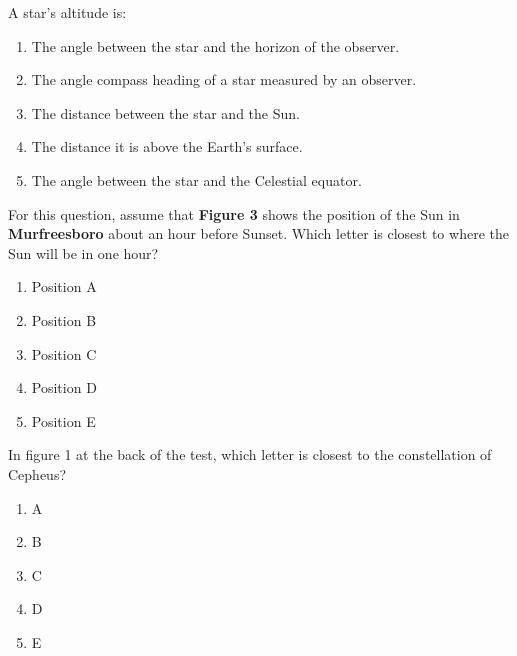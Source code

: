 \documentclass[11pt]{article}
\begin{document}
\begin{enumerate}
\begin{minipage}{\textwidth}
\begin{minipage}{\textwidth}
\item A star's altitude is:
\begin{enumerate} 
\setlength{\itemsep}{1pt} 
\setlength{\parskip}{0pt} 
\setlength{\parsep}{0pt}
\setlength{\multicolsep}{1pt} 
\item The angle between the star and the horizon of the observer.
\item The angle compass heading of a star measured by an observer.
\item The distance between the star and the Sun.
\item The distance it is above the Earth's surface.
\item The angle between the star and the Celestial equator.
\end{enumerate} 
\end{minipage}
\end{minipage}
\vskip 0.20in

\begin{minipage}{\textwidth}
\begin{minipage}{\textwidth}
\item For this question, assume that {\bf Figure 3} shows the position of the Sun in {\bf Murfreesboro} about an hour before Sunset.   Which letter is closest to where the Sun will be in one hour?
\begin{multicols}{3}
\begin{enumerate} 
\setlength{\itemsep}{1pt} 
\setlength{\parskip}{0pt} 
\setlength{\parsep}{0pt}
\setlength{\multicolsep}{1pt} 
\item Position A
\item Position B
\item Position C
\item Position D
\item Position E
\end{enumerate} 
\vfill 
\end{multicols}

\end{minipage}
\end{minipage}
\vskip 0.20in

\begin{minipage}{\textwidth}
\begin{minipage}{\textwidth}
\item In figure 1 at the back of the test, which letter is closest to the constellation of Cepheus?
\begin{multicols}{3}
\begin{enumerate} 
\setlength{\itemsep}{1pt} 
\setlength{\parskip}{0pt} 
\setlength{\parsep}{0pt}
\setlength{\multicolsep}{1pt} 
\item A
\item B
\item C
\item D
\item E
\end{enumerate} 
\vfill 
\end{multicols}


\end{minipage}
\end{minipage}
\end{enumerate}
\end{document}
